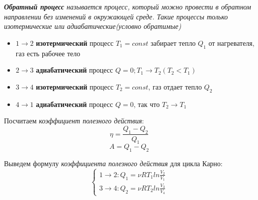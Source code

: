 \begin{center}
\end{center}
 \textit{\textbf{Обратный процесс} называется процесс, который можно провести в обратном направлении без изменений в окружающей среде. Такие процессы только изотермические или адиабатические(условно обратимые)}
\begin{itemize}
    \item $1 \to 2$ \textbf{изотермический} процесс $T_1 = const$ забирает тепло $Q_1$ от нагревателя, газ есть рабочее тело
    \item $2 \to 3$ \textbf{адиабатический} процесс $ Q = 0 ; T_1 \to T_2(T_2 < T_1)$
    \item $3 \to 4$ \textbf{изотермический} процесс $T_2 = const$, газ отдает тепло $Q_2$
    \item $4 \to 1$ \textbf{адиабатический} процесс $Q = 0$, так что $T_2 \to T_1$
\end{itemize}
Посчитаем \textit{коэффициент полезного действия}:
\[ \eta = \frac{Q_1 - Q_2}{Q_1}\]
\[A = Q_1 - Q_2 \]

Выведем формулу \textit{коэффициента полезного действия} для цикла Карно:
\begin{equation*}
    \begin{cases}
        1 \to 2: Q_1 = \nu RT_1 ln{\frac{V_2}{V_1}}
        \\
        3 \to 4: Q_2 = \nu RT_2 ln{\frac{V_3}{V_4}}
    \end{cases}
\end{equation*}

